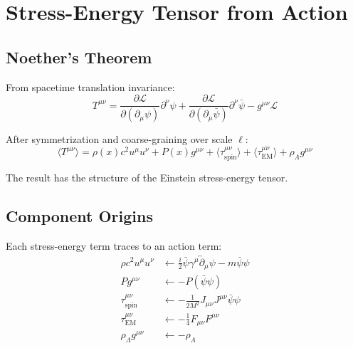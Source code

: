 \documentclass[11pt,a4paper]{article}
\theoremstyle{definition}
\theoremstyle{remark}
\begin{document}
	\section{Stress-Energy Tensor from Action}
	
	\subsection{Noether's Theorem}
	
	From spacetime translation invariance:
	\begin{equation}
		T^{\mu\nu} = \frac{\partial\mathcal{L}}{\partial(\partial_\mu\psi)}\partial^\nu\psi + \frac{\partial\mathcal{L}}{\partial(\partial_\mu\bar{\psi})}\partial^\nu\bar{\psi} - g^{\mu\nu}\mathcal{L}
	\end{equation}
	
	After symmetrization and coarse-graining over scale $\ell$:
	\begin{equation}
		\boxed{\langle T^{\mu\nu}\rangle = \rho(x)c^2 u^\mu u^\nu + P(x)g^{\mu\nu} + \langle\tau^{\mu\nu}_{\mathrm{spin}}\rangle + \langle\tau^{\mu\nu}_{\mathrm{EM}}\rangle + \rho_\Lambda g^{\mu\nu}}
		\label{eq:stress_energy_full}
	\end{equation}
	
	The result has the structure of the Einstein stress-energy tensor.
	
	\subsection{Component Origins}
	
	Each stress-energy term traces to an action term:
	\begin{align}
		\rho c^2 u^\mu u^\nu &\leftarrow \tfrac{i}{2}\bar{\psi}\gamma^\mu\overleftrightarrow{\partial}_\mu\psi - m\bar{\psi}\psi \\
		Pg^{\mu\nu} &\leftarrow -P(\bar{\psi}\psi) \\
		\tau^{\mu\nu}_{\mathrm{spin}} &\leftarrow -\tfrac{1}{2M^2}J_{\mu\nu}J^{\mu\nu}\bar{\psi}\psi \\
		\tau^{\mu\nu}_{\mathrm{EM}} &\leftarrow -\tfrac{1}{4}F_{\mu\nu}F^{\mu\nu} \\
		\rho_\Lambda g^{\mu\nu} &\leftarrow -\rho_\Lambda
	\end{align}
	
\end{document}
